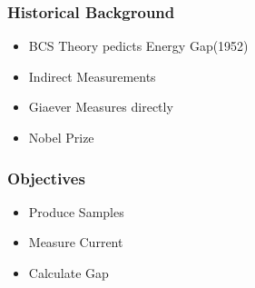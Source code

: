 \frame{\tableofcontents}

   \frame
     {
     \frametitle{Historical Background}
     
     \begin{itemize}
       \item<1-> BCS Theory pedicts Energy Gap(1952)
       \item<2-> Indirect Measurements
       \item<3-> Giaever Measures directly
       \item<4-> Nobel Prize
    \end{itemize}
    }
   

   \frame
  {
  \frametitle{Objectives}

    \begin{itemize}
      \item<1-> Produce Samples
      \item<2-> Measure Current
      \item<3-> Calculate Gap
   \end{itemize}
   }

